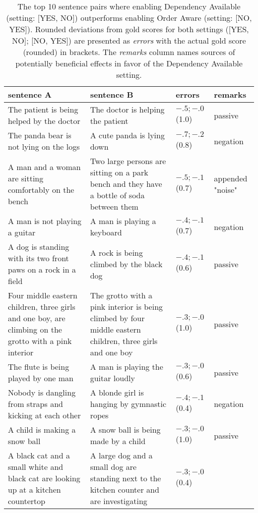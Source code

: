 \begin{table}[htb!]
	\centering
	\begin{tabularx}{\textwidth}{p{}|p{}|X|X} 
		\hline
		sentence A & sentence B & errors & remarks \\ \hline \hline
		The patient is being helped by the doctor & The doctor is helping the patient & $-.5;-.0$ (1.0) & passive \\ \hline
		The panda bear is not lying on the logs & A cute panda is lying down & $-.7;-.2$ (0.8) & negation \\ \hline
		A man and a woman are sitting comfortably on the bench & Two large persons are sitting on a park bench and they have a bottle of soda between them & $-.5;-.1$ (0.7) & appended "noise" \\ \hline
		A man is not playing a guitar & A man is playing a keyboard & $-.4;-.1$ (0.7) & negation \\ \hline
		A dog is standing with its two front paws on a rock in a field & A rock is being climbed by the black dog & $-.4;-.1$ (0.6) & passive \\ \hline
		Four middle eastern children, three girls and one boy, are climbing on the grotto with a pink interior & The grotto with a pink interior is being climbed by four middle eastern children, three girls and one boy & $-.3;-.0$ (1.0) & passive \\ \hline
		The flute is being played by one man & A man is playing the guitar loudly & $-.3;-.0$ (0.6) & passive \\ \hline
		Nobody is dangling from straps and kicking at each other & A blonde girl is hanging by gymnastic ropes & $-.4;-.1$ (0.4) & negation \\ \hline
		A child is making a snow ball & A snow ball is being made by a child & $-.3;-.0$ (1.0) & passive \\ \hline
		A black cat and a small white and black cat are looking up at a kitchen countertop & A large dog and a small dog are standing next to the kitchen counter and are investigating & $-.3;-.0$ (0.4) &  \\
		\hline \hline	
	\end{tabularx}
	\caption{The top 10 sentence pairs where enabling Dependency Available (setting: [YES, NO]) outperforms enabling Order Aware (setting: [NO, YES]). Rounded deviations from gold scores for both settings ([YES, NO]; [NO, YES]) are presented as \textit{errors} with the actual gold score (rounded) in brackets. The \textit{remarks} column names sources of potentially beneficial effects in favor of the Dependency Available setting.}
	\label{tab:results_benefit_DA}
\end{table}


